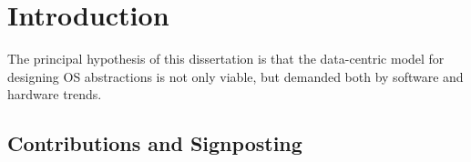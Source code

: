 
\chapter{Introduction}\label{ch:intro}

The principal hypothesis of this dissertation is that the data-centric model for designing OS abstractions
is not only viable, but demanded both by software and hardware trends.

\section*{Contributions and Signposting}